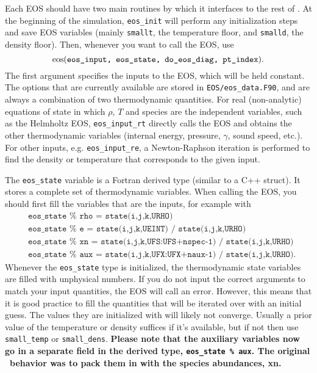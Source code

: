 Each EOS should have two main routines by which it interfaces to the
rest of \castro.  At the beginning of the simulation, {\tt eos\_init}
will perform any initialization steps and save EOS variables (mainly
\texttt{smallt}, the temperature floor, and \texttt{smalld}, the
density floor). Then, whenever you want to call the EOS, use
\[
{\bf \rm eos}(\texttt{eos\_input, eos\_state, do\_eos\_diag, pt\_index}).
\]
The first argument specifies the inputs to the EOS, which will be held
constant. The options that are currently available are stored in
{\tt EOS/eos\_data.F90}, and are always a combination of two
thermodynamic quantities. For real (non-analytic) equations of state
in which $\rho$, $T$ and species are the independent variables, such
as the Helmholtz EOS, {\tt eos\_input\_rt} directly calls the EOS
and obtains the other thermodynamic variables (internal energy,
pressure, $\gamma$, sound speed, etc.). For other inputs,
e.g. {\tt eos\_input\_re}, a Newton-Raphson iteration is performed
to find the density or temperature that corresponds to the given
input.

The {\tt eos\_state} variable is a Fortran derived type (similar to
a C++ struct). It stores a complete set of thermodynamic
variables. When calling the EOS, you should first fill the variables
that are the inputs, for example with
\begin{align*}
  &\texttt{eos\_state } \% \texttt{ rho = state(i,j,k,URHO)} \\
  &\texttt{eos\_state } \% \texttt{ e   = state(i,j,k,UEINT) / state(i,j,k,URHO)} \\
  &\texttt{eos\_state } \% \texttt{ xn  = state(i,j,k,UFS:UFS+nspec-1) / state(i,j,k,URHO)} \\
  &\texttt{eos\_state } \% \texttt{ aux = state(i,j,k,UFX:UFX+naux-1) / state(i,j,k,URHO)}.
\end{align*}
Whenever the \texttt{eos\_state} type is initialized, the
thermodynamic state variables are filled with unphysical numbers. If
you do not input the correct arguments to match your input quantities,
the EOS will call an error. However, this means that it is good
practice to fill the quantities that will be iterated over with an
initial guess. The values they are initialized with will likely not
converge. Usually a prior value of the temperature or density suffices
if it's available, but if not then use \texttt{small\_temp} or
\texttt{small\_dens}. \textbf{Please note that the auxiliary variables
  now go in a separate field in the derived type, {\tt eos\_state \%
  aux}. The original \castro\ behavior was to pack them in with the
  species abundances, xn.}

